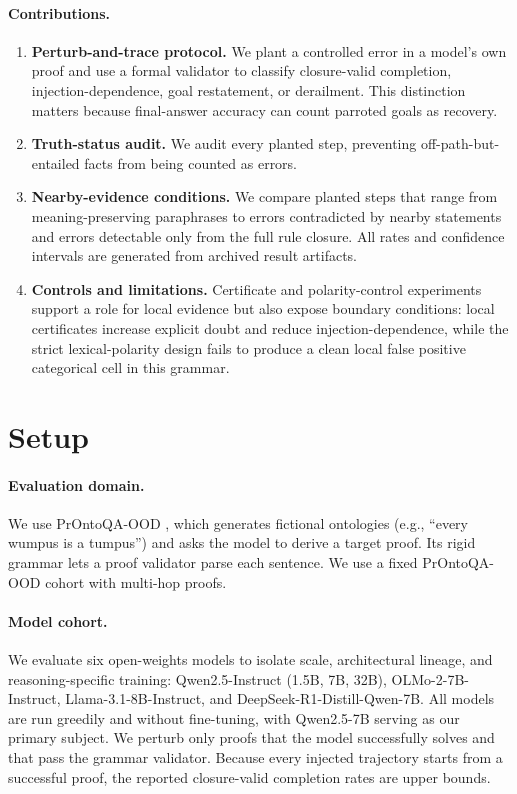 \documentclass{article}
\begin{document}
\paragraph{Contributions.}
\begin{enumerate}
    \item \textbf{Perturb-and-trace protocol.} We plant a controlled error in a model's own proof and use a formal validator to classify closure-valid completion, injection-dependence, goal restatement, or derailment. This distinction matters because final-answer accuracy can count parroted goals as recovery.
    \item \textbf{Truth-status audit.} We audit every planted step, preventing off-path-but-entailed facts from being counted as errors.
    \item \textbf{Nearby-evidence conditions.} We compare planted steps that range from meaning-preserving paraphrases to errors contradicted by nearby statements and errors detectable only from the full rule closure. All rates and confidence intervals are generated from archived result artifacts.
    \item \textbf{Controls and limitations.} Certificate and polarity-control experiments support a role for local evidence but also expose boundary conditions: local certificates increase explicit doubt and reduce injection-dependence, while the strict lexical-polarity design fails to produce a clean local false positive categorical cell in this grammar.
\end{enumerate}
\section{Setup}
\paragraph{Evaluation domain.} We use PrOntoQA-OOD \citep{saparov2023prontoqa}, which
generates fictional ontologies (e.g., ``every wumpus is a tumpus'') and asks the model
to derive a target proof. Its rigid grammar lets a proof validator parse each
sentence. We use a fixed PrOntoQA-OOD cohort with multi-hop proofs.

\paragraph{Model cohort.} We evaluate six open-weights models to isolate scale,
architectural lineage, and reasoning-specific training: Qwen2.5-Instruct (1.5B, 7B,
32B), OLMo-2-7B-Instruct, Llama-3.1-8B-Instruct, and DeepSeek-R1-Distill-Qwen-7B. All
models are run greedily and without fine-tuning, with Qwen2.5-7B serving as our
primary subject. We perturb only proofs that the model successfully solves and that
pass the grammar validator. Because every injected trajectory starts from a successful
proof, the reported closure-valid completion rates are upper bounds.
\end{document}
